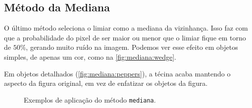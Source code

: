 \subsection{Método da Mediana}

O último método seleciona o limiar como a mediana da vizinhança. Isso faz com que a probabilidade do pixel de ser maior ou menor que o limiar fique em torno de $50\%$, gerando muito ruído na imagem. Podemos ver esse efeito em objetos simples, de apenas um cor, como na \cref{fig:mediana:wedge}.

Em objetos detalhados (\cref{fig:mediana:peppers}), a técina acaba mantendo o aspecto da figura original, em vez de enfatizar os objetos da figura.

\begin{figure}[H]
    \centering

    \caption{Exemplos de aplicação do método \texttt{mediana}.}
    \label{fig:mediana}
\end{figure}

